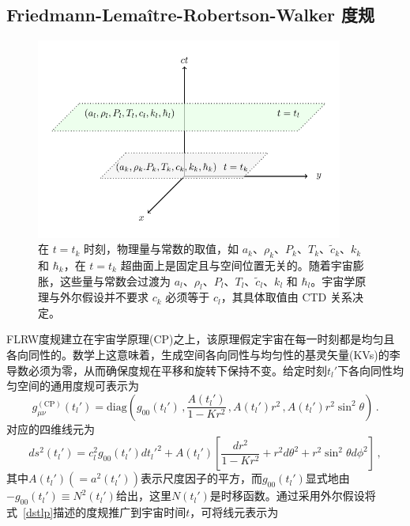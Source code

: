 \documentclass[jkps,preprint,fleqn]{revtex4}
\newcommand{\tc}{\tilde{c}}
\begin{document}
\begin{CJK*}{UTF8}{gbsn}
\section{Friedmann-Lemaître-Robertson-Walker 度规}
\label{sec:RWm}
\begin{figure}
	\begin{center}
	\includegraphics[width=0.9\textwidth]{Fig1.pdf}
	\caption{在 $t = t_k$ 时刻，物理量与常数的取值，如 $a_k$、$\rho_k$、$P_k$、$T_k$、$\tc_k$、$k_{k}$ 和 $\hbar_k$，在 $t=t_k$ 超曲面上是固定且与空间位置无关的。随着宇宙膨胀，这些量与常数会过渡为 $a_l$、$\rho_l$、$P_l$、$T_l$、$\tc_l$、$k_l$ 和 $\hbar_l$。宇宙学原理与外尔假设并不要求 $c_k$ 必须等于 $c_l$，其具体取值由 CTD 关系决定。}
	\label{Fig1}
	\end{center}
\end{figure}
FLRW度规建立在宇宙学原理(CP)之上，该原理假定宇宙在每一时刻都是均匀且各向同性的。数学上这意味着，生成空间各向同性与均匀性的基灵矢量(KVs)的李导数必须为零，从而确保度规在平移和旋转下保持不变\cite{Lee:2024mal,Ryder09}。给定时刻$t_l'$下各向同性均匀空间的通用度规可表示为
\begin{equation}
g_{\mu\nu}^{(\text{CP})}(t_l') = \text{diag} \left( g_{00}(t_l') \,,  \frac{A(t_l')}{1-Kr^2} \,,  A(t_l') r^2 \,,  A(t_l') r^2 \sin^2 \theta \right) \,.
\end{equation}
对应的四维线元为
\begin{equation}
ds^2(t_l') = c_l^2 g_{00}(t_l') dt_l'^2 + A(t_l') \left[ \frac{dr^2}{1-Kr^2} + r^2 d \theta^2 + r^2 \sin^2 \theta d \phi^2 \right] \label{dstlp} \,,
\end{equation}
其中$A(t_l') (= a^2(t_l'))$表示尺度因子的平方，而\( g_{00}(t_l') \)显式地由\(- g_{00}(t_l') \equiv N^2(t_l') \)给出，这里\( N(t_l') \)是时移函数\cite{Lee:2024zcu,Ryder09}。通过采用外尔假设将式~\eqref{dstlp}描述的度规推广到宇宙时间$t$，可将线元表示为

\end{CJK*}
\end{document}
